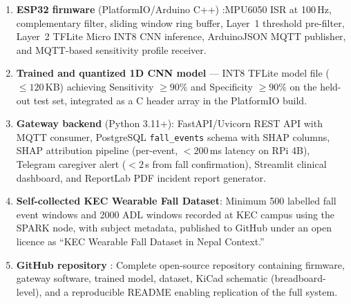 \begin{enumerate}
    \item \textbf{ESP32 firmware} (PlatformIO/Arduino C++) :MPU6050 ISR at 100\,Hz, complementary filter, sliding window ring buffer, Layer~1 threshold pre-filter, Layer~2 TFLite Micro INT8 CNN inference, ArduinoJSON MQTT publisher, and MQTT-based sensitivity profile receiver.

    \item \textbf{Trained and quantized 1D CNN model} --- INT8 TFLite model file ($\leq 120$\,KB) achieving Sensitivity $\geq 90\%$ and Specificity $\geq 90\%$ on the held-out test set, integrated as a C header array in the PlatformIO build.

    \item \textbf{Gateway backend} (Python 3.11+): FastAPI/Uvicorn REST API with MQTT consumer, PostgreSQL \texttt{fall\_events} schema with SHAP columns, SHAP attribution pipeline (per-event, $< 200$\,ms latency on RPi 4B), Telegram caregiver alert ($< 2$\,s from fall confirmation), Streamlit clinical dashboard, and ReportLab PDF incident report generator.

    \item \textbf{Self-collected KEC Wearable Fall Dataset}: Minimum 500 labelled fall event windows and 2000 ADL windows recorded at KEC campus using the SPARK node, with subject metadata, published to GitHub under an open licence as ``KEC Wearable Fall Dataset in Nepal Context.''

    \item \textbf{GitHub repository} : Complete open-source repository containing firmware, gateway software, trained model, dataset, KiCad schematic (breadboard-level), and a reproducible README enabling replication of the full system.

\end{enumerate}

